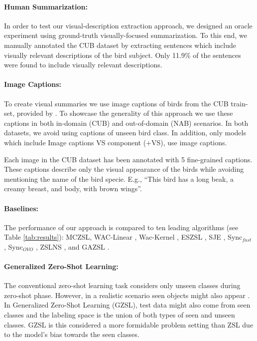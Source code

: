 \documentclass[11pt,a4paper]{article}
\begin{document}
\paragraph{Human Summarization:} 
In order to test our visual-description extraction approach, we designed an oracle experiment using ground-truth visually-focused summarization. To this end, we manually annotated the CUB dataset by extracting sentences which include visually relevant descriptions of the bird subject. Only 11.9\% of the sentences were found to include visually relevant descriptions.  

\paragraph{Image Captions:}
To create visual summaries we use image captions of birds from the CUB train-set, provided by \citet{reed2016learning}. To showcase the generality of this approach we use these captions in both in-domain (CUB) and out-of-domain (NAB) scenarios.
In both datasets, we avoid using captions of unseen bird class. In addition, only models which include Image captions VS component (+VS), use image captions.\par

Each image in the CUB dataset has been annotated with 5 fine-grained captions. These captions describe only the visual appearance of the birds while avoiding mentioning the name of the bird specie. E.g., \enquote{This bird has a long beak, a creamy breast, and body, with brown wings}. 

\par



\paragraph{Baselines:}  The performance of
our approach is compared to ten leading algorithms (see Table \ref{tab:results}): MCZSL\citep{akata2016multi}, WAC-Linear \citep{elhoseiny2013write}, Wac-Kernel \citep{elhoseiny2016write}, ESZSL \citep{romera2015embarrassingly}, SJE \citep{akata2015evaluation}, Sync$_{fast}$ \citep{changpinyo2016synthesized}, Sync$_{OVO}$ \citep{changpinyo2016synthesized},
ZSLNS \citep{qiao2016less}, and GAZSL \citep{zhu2018generative}. 


\paragraph{Generalized Zero-Shot Learning:} 
The conventional zero-shot learning task considers only unseen classes during zero-shot phase. However, in a realistic scenario seen objects might also appear \cite{chao2016empirical}. In Generalized Zero-Shot Learning (GZSL), test data might also come from seen classes and the labeling space is the union of both types of seen and unseen classes. GZSL is this considered a more formidable problem setting
than ZSL due to the model's bias towards the seen classes.\par
 
\end{document}
